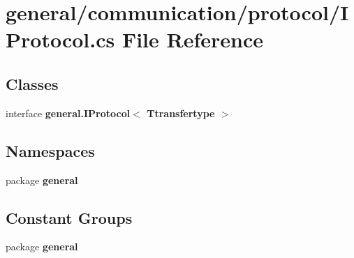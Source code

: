\section{general/communication/protocol/\-I\-Protocol.cs File Reference}
\label{_i_protocol_8cs}
\subsection*{Classes}
\begin{DoxyCompactItemize}
\item 
interface {\bf general.\-I\-Protocol$<$ Ttransfertype $>$}
\end{DoxyCompactItemize}
\subsection*{Namespaces}
\begin{DoxyCompactItemize}
\item 
package {\bf general}
\end{DoxyCompactItemize}
\subsection*{Constant Groups}
\begin{DoxyCompactItemize}
\item 
package {\bf general}
\end{DoxyCompactItemize}
